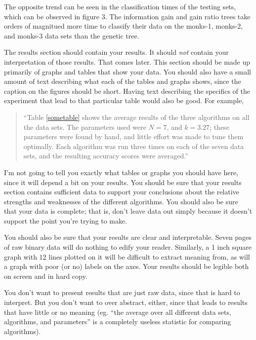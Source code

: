 \documentclass[12pt, letterpaper]{article}
\begin{document}
The opposite trend can be seen in the classification times of the testing sets,
which can be observed in figure 3.
The information gain and gain ratio trees take orders of magnitued more time
to classify their data on the monks-1, monks-2, and monks-3 data sets than the
genetic tree.


The results section should contain your results.  It should \emph{not} contain
your interpretation of those results.  That comes later.  This section should be
made up primarily of graphs and tables that show your data.  You should also
have a small amount of text describing what each of the tables and graphs shows,
since the caption on the figures should be short.  Having text describing the
specifics of the experiment that lead to that particular table would also be
good.  For example,

\begin{quote}
``Table \ref{sometable} shows the average results of the three algorithms on all
the data sets.  The parameters used were $N=7$, and $k=3.27$; these parameters
were found by hand, and little effort was made to tune them optimally.  Each
algorithm was run three times on each of the seven data sets, and the resulting
accuracy scores were averaged.''
\end{quote}

I'm not going to tell you exactly what tables or graphs you should have here,
since it will depend a bit on your results.  You should be sure that your
results section contains sufficient data to support your conclusions about the
relative strengths and weaknesses of the different algorithms.  You should also
be sure that your data is complete; that is, don't leave data out simply because
it doesn't support the point you're trying to make.

You should also be sure that your results are clear and interpretable.  Seven
pages of raw binary data will do nothing to edify your reader.  Similarly, a
1 inch square graph with 12 lines plotted on it will be difficult to extract
meaning from, as will a graph with poor (or no) labels on the axes.  Your
results should be legible both on screen and in hard copy.

You don't want to present results that are just raw data, since that is hard to
interpret.  But you don't want to over abstract, either, since that leads to
results that have little or no meaning (eg. ``the average over all different
data sets, algorithms, and parameters'' is a completely useless statistic for
comparing algorithms).
\end{document}
